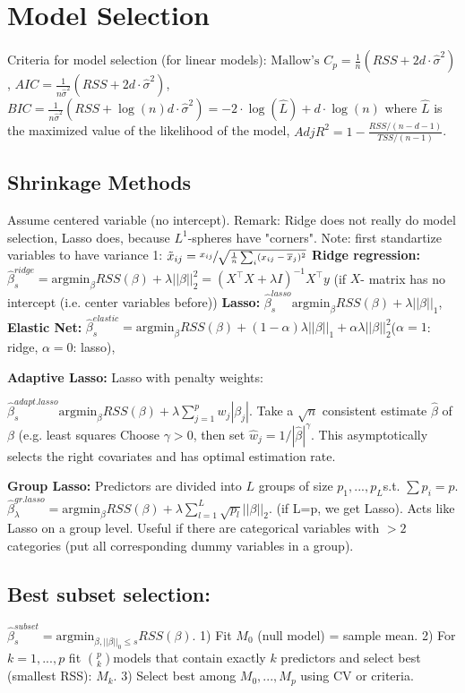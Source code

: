 \section*{Model Selection}
Criteria for model selection (for linear models): $\text{Mallow's }C_p=\tfrac 1 n (RSS + 2d\cdot \hat\sigma^2)$, $AIC = \tfrac{1}{n\hat\sigma^2}(RSS+2d\cdot\hat\sigma^2)$, $BIC= \tfrac{1}{n\hat\sigma^2}(RSS+\log(n)d\cdot\hat\sigma^2) = -2 \cdot\log(\hat L) + d\cdot\log(n)$ where $\hat L$ is the maximized value of the likelihood of the model, $AdjR^2=1-\tfrac{RSS / (n-d-1)}{TSS / (n-1)}$.

\subsection*{Shrinkage Methods}
Assume centered variable (no intercept).
Remark: Ridge does not really do model selection, Lasso does, because $L^1$-spheres have "corners".
Note: first standartize variables to have variance 1: $\tilde x_{ij}=\sfrac{x_{ij}}{\sqrt{\tfrac{1}{n} \sum_i(x_{ij}- \overline x_j)^2}}$
\textbf{Ridge regression:} $\hat\beta_s^{ridge} = \text{argmin}_\beta RSS(\beta) + \lambda ||\beta||_2^2 = (X^\top X + \lambda I)^{-1}X^\top y$ (if $X$- matrix has no intercept (i.e. center variables before))
\textbf{Lasso:} $\hat\beta_s^{lasso}\text{argmin}_\beta RSS(\beta) + \lambda ||\beta||_1$,
\textbf{Elastic Net:} $\hat\beta_s^{elastic} = \text{argmin}_\beta RSS(\beta)+(1-\alpha)\lambda||\beta||_1 + \alpha \lambda ||\beta||_2^2$($\alpha=1$: ridge, $\alpha=0$: lasso),

\textbf{Adaptive Lasso:} Lasso with penalty weights:

$\hat\beta_s^{adapt.lasso}\text{argmin}_\beta RSS(\beta) + \lambda \sum_{j=1}^p w_j |\beta_j|$. Take a $\sqrt{n}$ consistent estimate $\hat\beta$ of $\beta$ (e.g. least squares Choose $\gamma>0$, then set $\hat w_j = {1}/{|\hat\beta|^\gamma}$.
This asymptotically selects the right covariates and has optimal estimation rate.

\textbf{Group Lasso:} Predictors are divided into $L$ groups of size $p_1, ..., p_L$s.t. $\sum p_i = p$. $\hat\beta_\lambda^{gr.lasso}=\text{argmin}_\beta RSS(\beta)+\lambda \sum_{l=1}^L \sqrt{p_l} ||\beta||_2$. (if L=p, we get Lasso).
Acts like Lasso on a group level.
Useful if there are categorical variables with $>2$ categories (put all corresponding dummy variables in a group).

\subsection*{Best subset selection:}
$\hat\beta_s^{subset} = \text{argmin}_{\beta, ||\beta||_0 \leq s} RSS(\beta)$. 1) Fit $M_0$ (null model) = sample mean. 2) For $k=1,...,p$ fit $\binom p k$models that contain exactly $k$ predictors and select best (smallest RSS): $M_k$. 3) Select best among $M_0, ..., M_p$ using CV or criteria.

